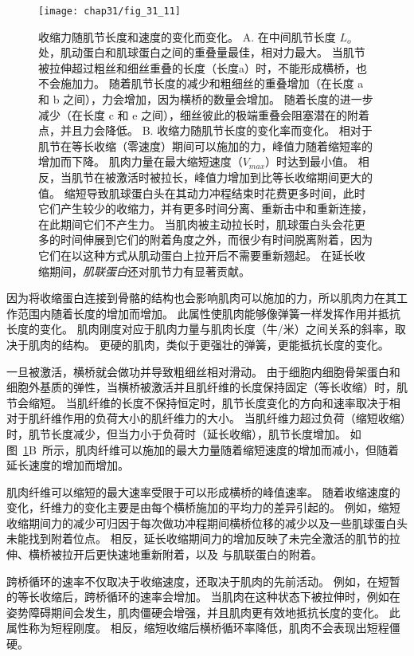 \begin{figure}[htbp]
	\centering
	\texttt{[image: chap31/fig\_31\_11]}
	\caption{收缩力随肌节长度和速度的变化而变化。
	A. 在中间肌节长度 $ L_o $ 处，肌动蛋白和肌球蛋白之间的重叠量最佳，相对力最大。
	当肌节被拉伸超过粗丝和细丝重叠的长度（长度a）时，不能形成横桥，也不会施加力。
	随着肌节长度的减少和粗细丝的重叠增加（在长度 a 和 b 之间），力会增加，因为横桥的数量会增加。
	随着长度的进一步减少（在长度 c 和 e 之间），细丝彼此的极端重叠会阻塞潜在的附着点，并且力会降低。
	B. 收缩力随肌节长度的变化率而变化。
	相对于肌节在等长收缩（零速度）期间可以施加的力，峰值力随着缩短率的增加而下降。
	肌肉力量在最大缩短速度（$ V_{max} $）时达到最小值。
	相反，当肌节在被激活时被拉长，峰值力增加到比等长收缩期间更大的值。
	缩短导致肌球蛋白头在其动力冲程结束时花费更多时间，此时它们产生较少的收缩力，并有更多时间分离、重新击中和重新连接，在此期间它们不产生力。
	当肌肉被主动拉长时，肌球蛋白头会花更多的时间伸展到它们的附着角度之外，而很少有时间脱离附着，因为它们在以这种方式从肌动蛋白上拉开后不需要重新翘起。
	在延长收缩期间，\textit{肌联蛋白}还对肌节力有显著贡献。}
	\label{fig:31_11}
\end{figure}


因为将收缩蛋白连接到骨骼的结构也会影响肌肉可以施加的力，所以肌肉力在其工作范围内随着长度的增加而增加。
此属性使肌肉能够像弹簧一样发挥作用并抵抗长度的变化。
肌肉刚度对应于肌肉力量与肌肉长度（牛/米）之间关系的斜率，取决于肌肉的结构。
更硬的肌肉，类似于更强壮的弹簧，更能抵抗长度的变化。


一旦被激活，横桥就会做功并导致粗细丝相对滑动。
由于细胞内细胞骨架蛋白和细胞外基质的弹性，当横桥被激活并且肌纤维的长度保持固定（等长收缩）时，肌节会缩短。
当肌纤维的长度不保持恒定时，肌节长度变化的方向和速率取决于相对于肌纤维作用的负荷大小的肌纤维力的大小。
当肌纤维力超过负荷（缩短收缩）时，肌节长度减少，但当力小于负荷时（延长收缩），肌节长度增加。
如图~\ref{fig:31_11}B~所示，肌肉纤维可以施加的最大力量随着缩短速度的增加而减小，但随着延长速度的增加而增加。


肌肉纤维可以缩短的最大速率受限于可以形成横桥的峰值速率。
随着收缩速度的变化，纤维力的变化主要是由每个横桥施加的平均力的差异引起的。
例如，缩短收缩期间力的减少可归因于每次做功冲程期间横桥位移的减少以及一些肌球蛋白头未能找到附着位点。
相反，延长收缩期间力的增加反映了未完全激活的肌节的拉伸、横桥被拉开后更快速地重新附着，以及  与肌联蛋白的附着。


跨桥循环的速率不仅取决于收缩速度，还取决于肌肉的先前活动。
例如，在短暂的等长收缩后，跨桥循环的速率会增加。
当肌肉在这种状态下被拉伸时，例如在姿势障碍期间会发生，肌肉僵硬会增强，并且肌肉更有效地抵抗长度的变化。
此属性称为短程刚度。
相反，缩短收缩后横桥循环率降低，肌肉不会表现出短程僵硬。



